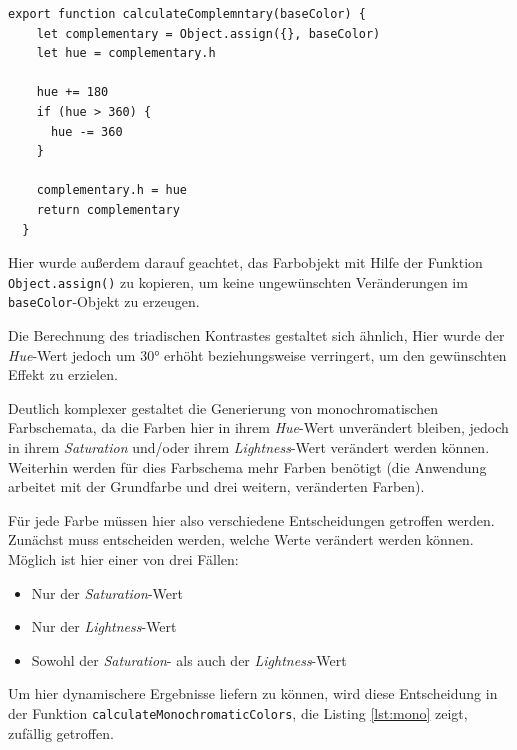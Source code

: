 \begin{lstlisting}[caption=Berechnung eines Komplementär-Kontrastes, label=lst:complementary]
  export function calculateComplemntary(baseColor) {
    let complementary = Object.assign({}, baseColor)
    let hue = complementary.h

    hue += 180
    if (hue > 360) {
      hue -= 360
    }

    complementary.h = hue
    return complementary
  }
\end{lstlisting}

Hier wurde außerdem darauf geachtet, das Farbobjekt mit Hilfe der Funktion \verb|Object.assign()| zu kopieren, um keine ungewünschten Veränderungen im \verb|baseColor|-Objekt zu erzeugen\footnotemark{}.


Die Berechnung des triadischen Kontrastes gestaltet sich ähnlich, Hier wurde der \textit{Hue}-Wert jedoch um 30° erhöht beziehungsweise verringert, um den gewünschten Effekt zu erzielen.

Deutlich komplexer gestaltet die Generierung von monochromatischen Farbschemata, da die Farben hier in ihrem \textit{Hue}-Wert unverändert bleiben, jedoch in ihrem \textit{Saturation} und/oder ihrem \textit{Lightness}-Wert verändert werden können. Weiterhin werden für dies Farbschema mehr Farben benötigt (die Anwendung arbeitet mit der Grundfarbe und drei weitern, veränderten Farben).

Für jede Farbe müssen hier also verschiedene Entscheidungen getroffen werden. Zunächst muss entscheiden werden, welche Werte verändert werden können. Möglich ist hier einer von drei Fällen:

\begin{itemize}
  \item Nur der \textit{Saturation}-Wert
  \item Nur der \textit{Lightness}-Wert
  \item Sowohl der \textit{Saturation}- als auch der \textit{Lightness}-Wert
\end{itemize}

Um hier dynamischere Ergebnisse liefern zu können, wird diese Entscheidung in der Funktion \verb|calculateMonochromaticColors|, die Listing \ref{lst:mono} zeigt, zufällig getroffen.

